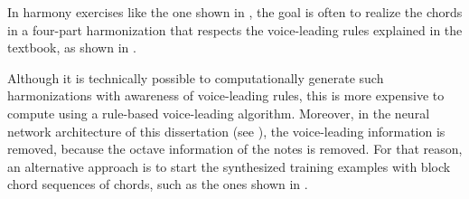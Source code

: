 
In harmony exercises like the one shown in
, the goal is often to
\gls{realize} the chords in a four-part harmonization that
respects the voice-leading rules explained in the textbook,
as shown in . 


Although it is technically possible to computationally
generate such harmonizations with awareness of voice-leading
rules, this is more expensive to compute using a rule-based
voice-leading
algorithm.
Moreover, in the neural network architecture of this
dissertation (see ), the voice-leading
information is removed, because the octave information of
the notes is removed. For that reason, an alternative
approach is to start the synthesized training examples with
block chord sequences of chords, such as the ones shown in
.

